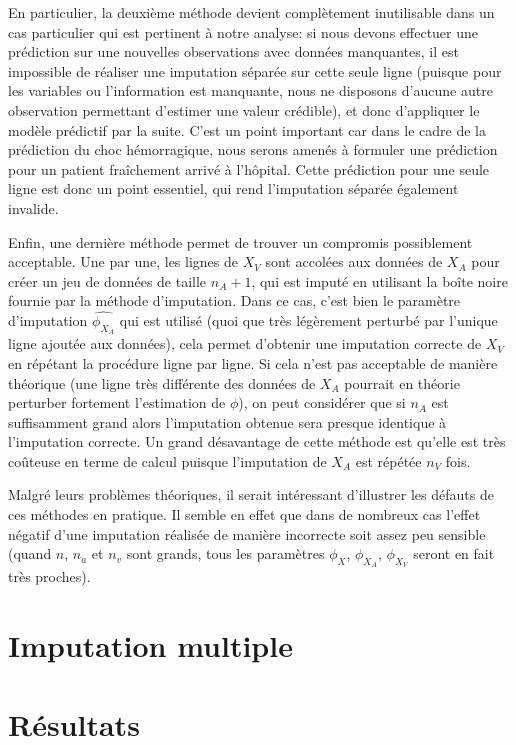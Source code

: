 \documentclass[12pt, a4paper]{article}
\begin{document}
En particulier, la deuxième méthode devient complètement inutilisable dans un cas particulier qui est pertinent à notre analyse: si nous devons effectuer une prédiction sur une nouvelles observations avec données manquantes, il est impossible de réaliser une imputation séparée sur cette seule ligne (puisque pour les variables ou l'information est manquante, nous ne disposons d'aucune autre observation permettant d'estimer une valeur crédible), et donc d'appliquer le modèle prédictif par la suite. C'est un point important car dans le cadre de la prédiction du choc hémorragique, nous serons amenés à formuler une prédiction pour un patient fraîchement arrivé à l'hôpital. Cette prédiction pour une seule ligne est donc un point essentiel, qui rend l'imputation séparée également invalide.

Enfin, une dernière méthode permet de trouver un compromis possiblement acceptable. Une par une, les lignes de $X_V$ sont accolées aux données de $X_A$ pour créer un jeu de données de taille $n_A +1$, qui est imputé en utilisant la boîte noire fournie par la méthode d'imputation. Dans ce cas, c'est bien le paramètre d'imputation $\hat{\phi_{X_A}}$ qui est utilisé (quoi que très légèrement perturbé par l'unique ligne ajoutée aux données), cela permet d'obtenir une imputation correcte de $X_V$ en répétant la procédure ligne par ligne. Si cela n'est pas acceptable de manière théorique (une ligne très différente des données de $X_A$ pourrait en théorie perturber fortement l'estimation de $\phi$), on peut considérer que si $n_A$ est suffisamment grand alors l'imputation obtenue sera presque identique à l'imputation correcte. Un grand désavantage de cette méthode est qu'elle est très coûteuse en terme de calcul puisque l'imputation de $X_A$ est répétée $n_V$ fois. 

Malgré leurs problèmes théoriques, il serait intéressant d'illustrer les défauts de ces méthodes en pratique. Il semble en effet que dans de nombreux cas l'effet négatif d'une imputation réalisée de manière incorrecte soit assez peu sensible (quand $n$, $n_a$ et $n_v$ sont grands, tous les paramètres $\phi_X$, $\phi_{X_A}$, $\phi_{X_V}$ seront en fait très proches).

\section{Imputation multiple}
\section{Résultats}


\label{Results}
\end{document}
